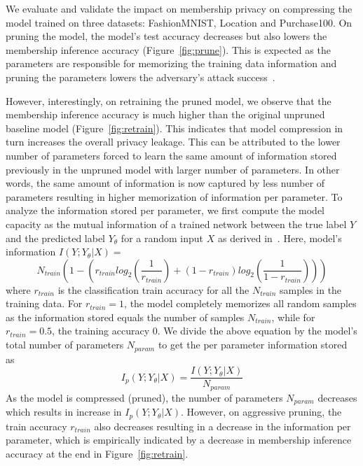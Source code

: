 We evaluate and validate the impact on membership privacy on compressing the model trained on three datasets: FashionMNIST, Location and Purchase100.
On pruning the model, the model's test accuracy decreases but also lowers the membership inference accuracy (Figure~\ref{fig:prune}).
This is expected as the parameters are responsible for memorizing the training data information and pruning the parameters lowers the adversary's attack success~\cite{rezawhite}.

However, interestingly, on retraining the pruned model, we observe that the membership inference accuracy is much higher than the original unpruned baseline model (Figure~\ref{fig:retrain}).
This indicates that model compression in turn increases the overall privacy leakage.
This can be attributed to the lower number of parameters forced to learn the same amount of information stored previously in the unpruned model with larger number of parameters.
In other words, the same amount of information is now captured by less number of parameters resulting in higher memorization of information per parameter.
To analyze the information stored per parameter, we first compute the model capacity as the mutual information of a trained network between the true label $Y$ and the predicted label $Y_{\theta}$ for a random input $X$ as derived in~\cite{45932,cap}.
Here, model's information $I(Y;Y_{\theta}|X) = $
\begin{equation}
N_{train}\left(1 - (r_{train}log_2(\frac{1}{r_{train}}) + (1-r_{train})log_2(\frac{1}{1-r_{train}}))\right)
\end{equation}
where $r_{train}$ is the classification train accuracy for all the $N_{train}$ samples in the training data.
For $r_{train} = 1$, the model completely memorizes all random samples as the information stored equals the number of samples $N_{train}$, while for $r_{train}=0.5$, the training accuracy 0.
We divide the above equation by the model's total number of parameters $N_{param}$ to get the per parameter information stored as
\begin{equation}
I_p(Y;Y_{\theta}|X) = \frac{I(Y;Y_{\theta}|X)}{N_{param}}
\end{equation}
As the model is compressed (pruned), the number of parameters $N_{param}$ decreases which results in increase in $I_p(Y;Y_{\theta}|X)$. However, on aggressive pruning, the train accuracy $r_{train}$ also decreases resulting in a decrease in the information per parameter, which is empirically indicated by a decrease in membership inference accuracy at the end in Figure~\ref{fig:retrain}.


